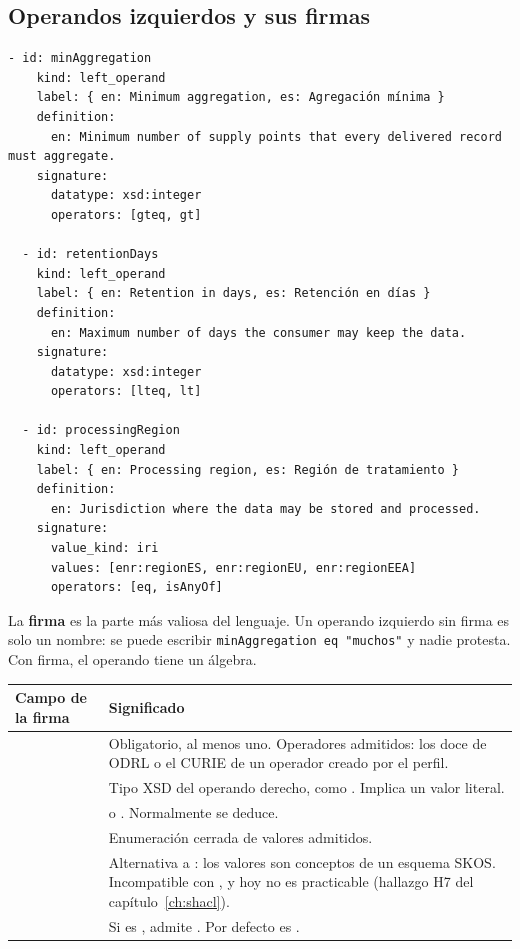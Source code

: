 \subsection{Operandos izquierdos y sus firmas}

\begin{lstlisting}[style=yaml, firstnumber=57]
  - id: minAggregation
    kind: left_operand
    label: { en: Minimum aggregation, es: Agregación mínima }
    definition:
      en: Minimum number of supply points that every delivered record must aggregate.
    signature:
      datatype: xsd:integer
      operators: [gteq, gt]

  - id: retentionDays
    kind: left_operand
    label: { en: Retention in days, es: Retención en días }
    definition:
      en: Maximum number of days the consumer may keep the data.
    signature:
      datatype: xsd:integer
      operators: [lteq, lt]

  - id: processingRegion
    kind: left_operand
    label: { en: Processing region, es: Región de tratamiento }
    definition:
      en: Jurisdiction where the data may be stored and processed.
    signature:
      value_kind: iri
      values: [enr:regionES, enr:regionEU, enr:regionEEA]
      operators: [eq, isAnyOf]
\end{lstlisting}

La \textbf{firma} es la parte más valiosa del lenguaje. Un operando izquierdo sin firma es solo un nombre: se
puede escribir \texttt{minAggregation eq "muchos"} y nadie protesta. Con firma, el operando tiene un álgebra.

\noindent\begin{tabularx}{\linewidth}{@{}L{3.1cm}Y@{}}
\toprule
\textbf{Campo de la firma} & \textbf{Significado} \\
\midrule
{} & Obligatorio, al menos uno. Operadores admitidos: los doce de ODRL o el CURIE de un operador creado por el perfil. \\
 & Tipo XSD del operando derecho, como . Implica un valor literal. \\
 &  o . Normalmente se deduce. \\
 & Enumeración cerrada de valores admitidos. \\
 & Alternativa a : los valores son conceptos de un esquema SKOS. Incompatible con , y hoy no es practicable (hallazgo H7 del capítulo~\ref{ch:shacl}). \\
 & Si es , admite . Por defecto es . \\
\bottomrule
\end{tabularx}


